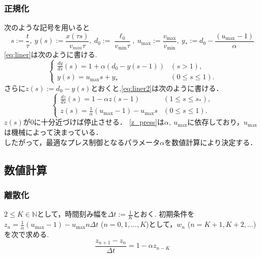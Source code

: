 \documentclass [dvipdfmx] {jsarticle}
\numberwithin{equation}{section}
\theoremstyle{definition} %
\theoremstyle{definition} %
\begin{document}
\subsubsection{正規化}
次のような記号を用いると
\begin{equation}
    s:=\displaystyle\frac{t}{\tau},\ y(s):=\displaystyle\frac{x(\tau s)}{v_{min}\tau},\
    d_0:=\frac{\ell_0}{v_{\min}\tau},\ u_{\max}:=\displaystyle\frac{v_{\max}}{v_{\min}},\ 
    y_\ast:=d_0-\displaystyle\frac{(u_{\max}-1)}{\alpha}
\end{equation}
\eqref{eq:liner}は次のように書ける.
\begin{equation}\label{eq:liner2}\begin{cases}
    \displaystyle\frac{dy}{ds}(s)=1+\alpha(d_0-y(s-1)) &(s>1),\\
    y(s)=u_{\max}s+y_\ast &(0\le s \le 1).
\end{cases}\end{equation}
さらに$z(s):=d_0-y(s)$とおくと,\eqref{eq:liner2}は次のように書ける．
\begin{equation}\label{z_press}\begin{cases}
    \displaystyle\frac{dz}{ds}(s)=1-\alpha z(s-1) &(1\le s\le s_\ast),\\
    z(s)=\displaystyle\frac{1}{\alpha}(u_{\max}-1)-u_{\max}s &(0\le s\le 1).
\end{cases}\end{equation}
$z(s)$が$0$に十分近づけば停止させる．
\eqref{z_press}は$\alpha,\ u_{\max}$に依存しており，$u_{\max}$は機械によって決まっている．\\
したがって，最適なプレス制御となるパラメータ$\alpha$を数値計算により決定する．


\subsection{数値計算}


\subsubsection{離散化}
$2\le K\in\mathbb{N}$として，時間刻み幅を$\Delta t:=\frac{1}{K}$とおく.
初期条件を$z_n=\frac{1}{\alpha} (u_{\max}-1)-u_{\max} n \Delta t$ ($n=0,1,...,K$)として，$w_n$ ($n=K+1,K+2,...$)
を次で求める.
\begin{equation}\label{z_method}
    \displaystyle\frac{z_{n+1}-z_n}{\Delta t}=1-\alpha z_{n-K}
\end{equation}
\end{document}
